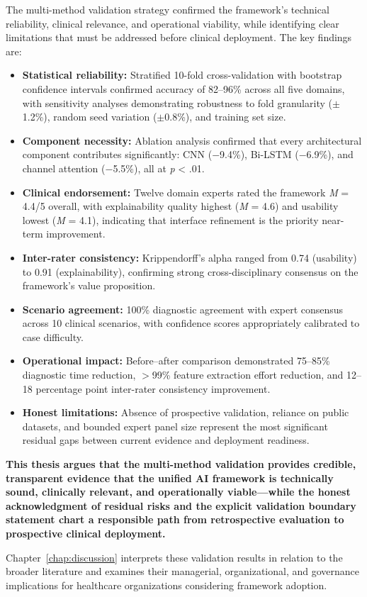 The multi-method validation strategy confirmed the framework's technical reliability, clinical relevance, and operational viability, while identifying clear limitations that must be addressed before clinical deployment. The key findings are:

\begin{itemize}
    \item \textbf{Statistical reliability:} Stratified 10-fold cross-validation with bootstrap confidence intervals confirmed accuracy of 82--96\% across all five domains, with sensitivity analyses demonstrating robustness to fold granularity ($\pm$1.2\%), random seed variation ($\pm$0.8\%), and training set size.

    \item \textbf{Component necessity:} Ablation analysis confirmed that every architectural component contributes significantly: CNN ($-$9.4\%), Bi-LSTM ($-$6.9\%), and channel attention ($-$5.5\%), all at \textit{p} < .01.

    \item \textbf{Clinical endorsement:} Twelve domain experts rated the framework \textit{M} = 4.4/5 overall, with explainability quality highest (\textit{M} = 4.6) and usability lowest (\textit{M} = 4.1), indicating that interface refinement is the priority near-term improvement.

    \item \textbf{Inter-rater consistency:} Krippendorff's alpha ranged from 0.74 (usability) to 0.91 (explainability), confirming strong cross-disciplinary consensus on the framework's value proposition.

    \item \textbf{Scenario agreement:} 100\% diagnostic agreement with expert consensus across 10 clinical scenarios, with confidence scores appropriately calibrated to case difficulty.

    \item \textbf{Operational impact:} Before--after comparison demonstrated 75--85\% diagnostic time reduction, $>$99\% feature extraction effort reduction, and 12--18 percentage point inter-rater consistency improvement.

    \item \textbf{Honest limitations:} Absence of prospective validation, reliance on public datasets, and bounded expert panel size represent the most significant residual gaps between current evidence and deployment readiness.
\end{itemize}

\textbf{This thesis argues that the multi-method validation provides credible, transparent evidence that the unified AI framework is technically sound, clinically relevant, and operationally viable---while the honest acknowledgment of residual risks and the explicit validation boundary statement chart a responsible path from retrospective evaluation to prospective clinical deployment.}

Chapter~\ref{chap:discussion} interprets these validation results in relation to the broader literature and examines their managerial, organizational, and governance implications for healthcare organizations considering framework adoption.
